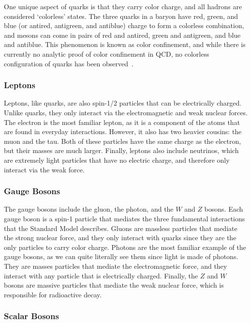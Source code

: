 One unique aspect of quarks is that they carry color charge, and all hadrons are considered `colorless' states.
The three quarks in a baryon have red, green, and blue (or antired, antigreen, and antiblue) charge to form a colorless combination, and mesons can come in pairs of red and antired, green and antigreen, and blue and antiblue.
This phenomenon is known as color confinement, and while there is currently no analytic proof of color confinement in QCD, no colorless configuration of quarks has been observed~\cite{muta2010foundations}.

\subsubsection{Leptons}

Leptons, like quarks, are also spin-1/2 particles that can be electrically charged.
Unlike quarks, they only interact via the electromagnetic and weak nuclear forces.
The electron is the most familiar lepton, as it is a component of the atoms that are found in everyday interactions.
However, it also has two heavier cousins: the muon and the tau.
Both of these particles have the same charge as the electron, but their masses are much larger.
Finally, leptons also include neutrinos, which are extremely light particles that have no electric charge, and therefore only interact via the weak force.

\subsubsection{Gauge Bosons}

The gauge bosons include the gluon, the photon, and the $W$ and $Z$ bosons.
Each gauge boson is a spin-1 particle that mediates the three fundamental interactions that the Standard Model describes.
Gluons are massless particles that mediate the strong nuclear force, and they only interact with quarks since they are the only particles to carry color charge.
Photons are the most familiar example of the gauge bosons, as we can quite literally see them since light is made of photons.
They are masses particles that mediate the electromagnetic force, and they interact with any particle that is electrically charged.
Finally, the $Z$ and $W$ bosons are massive particles that mediate the weak nuclear force, which is responsible for radioactive decay.

\subsubsection{Scalar Bosons}


